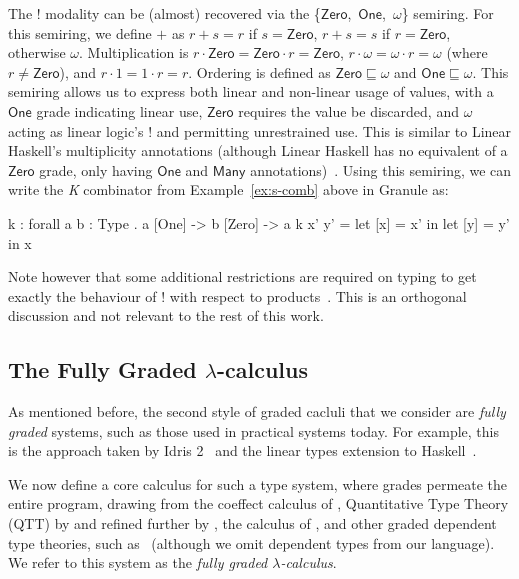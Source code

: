 \begin{example}

  \label{example:01omega}
    The $!$ modality can be (almost) recovered via the \{$\mathsf{Zero}$,\
    $\mathsf{One}$,\ $\omega$\} semiring. For this semiring, we define $+$ as $r
    + s = r$ if $s = \mathsf{Zero}$, $r + s = s$ if $r = \mathsf{Zero}$,
    otherwise $\omega$. Multiplication is $r \cdot \mathsf{Zero} = \mathsf{Zero}
    \cdot r = \mathsf{Zero}$, $r \cdot \omega = \omega \cdot r = \omega$ (where
    $r \neq \mathsf{Zero}$), and $r \cdot 1 = 1 \cdot r = r$. Ordering is
    defined as $\mathsf{Zero} \sqsubseteq \omega$ and $\mathsf{One} \sqsubseteq
    \omega$. This semiring allows us to express both linear and non-linear usage
    of values, with a $\mathsf{One}$ grade indicating linear use,
    $\mathsf{Zero}$ requires the value be discarded, and $\omega$ acting as
    linear logic's ! and permitting unrestrained use. This is similar to Linear
    Haskell's multiplicity annotations (although Linear Haskell has no
    equivalent of a $\mathsf{Zero}$ grade, only having $\mathsf{One}$ and
    $\mathsf{Many}$ annotations)~\citep{DBLP:journals/pacmpl/BernardyBNJS18}.
    Using this semiring, we can write the \emph{K} combinator from
    Example~\ref{ex:s-comb} above in Granule as:
    \begin{granule}
k : forall { a b : Type } . a [One] -> b [Zero] -> a
k x' y' = let [x] = x' in let [y] = y' in x
      \end{granule}
  Note however that some additional restrictions are required on typing to get
  exactly the behaviour of $!$ with respect to
  products~\citep{hughes:lirmm-03271465}. This is an orthogonal discussion and
  not relevant to the rest of this work.
  \end{example}

\subsection{The Fully Graded $\lambda$-calculus}
\label{sec:graded-base}
As mentioned before, the second style of graded cacluli that we consider are
\emph{fully graded} systems, such as those used in practical systems today. For
example, this is the approach taken by Idris
2~\citep{DBLP:journals/corr/abs-2104-00480} and the linear types extension to
Haskell~\citep{DBLP:journals/pacmpl/BernardyBNJS18}.

We now define a core calculus for such a type system, where grades permeate the
entire program, drawing from the coeffect calculus of
\citet{petricek2014coeffects}, Quantitative Type Theory (QTT) by
\citet{McBride2016} and refined further by \citet{quantitative-type-theory}, the calculus of
\citet{DBLP:journals/pacmpl/AbelB20}, and other graded dependent type theories,
such as~\citet{DBLP:conf/esop/MoonEO21} (although we omit dependent types from our language). We refer to this system as the
\textit{fully graded $\lambda$-calculus}.

